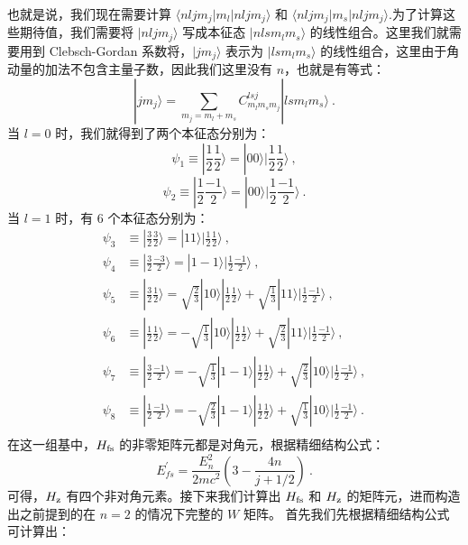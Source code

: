 也就是说，我们现在需要计算 $\langle nljm_j|m_l|nljm_j\rangle$ 和 $\langle nljm_j|m_s|nljm_j\rangle$.为了计算这些期待值，我们需要将 $|nljm_j\rangle$ 写成本征态 $|nlsm_lm_s\rangle$ 的线性组合。这里我们就需要用到 Clebsch-Gordan 系数将，$|jm_j\rangle$ 表示为 $|lsm_lm_s\rangle$ 的线性组合，这里由于角动量的加法不包含主量子数，因此我们这里没有 $n$，也就是有等式：
\begin{equation}
|jm_j\rangle = \sum_{m_j=m_l+m_s}C^{lsj}_{m_lm_sm_j}|lsm_lm_s\rangle~.
\end{equation}
当 $l=0$ 时，我们就得到了两个本征态分别为：
\begin{equation}
\psi_1\equiv|\frac{1}{2}\frac{1}{2}\rangle=|00\rangle|\frac{1}{2}\frac{1}{2}\rangle~,
\end{equation}
\begin{equation}
\psi_2\equiv|\frac{1}{2}\frac{-1}{2}\rangle=|00\rangle|\frac{1}{2}\frac{-1}{2}\rangle~.
\end{equation}
当 $l=1$ 时，有 $6$ 个本征态分别为：
\begin{align}
\psi_3&\equiv|\frac{3}{2}\frac{3}{2}\rangle=|11\rangle|\frac{1}{2}\frac{1}{2}\rangle~,\\
\psi_4&\equiv|\frac{3}{2}\frac{-3}{2}\rangle=|1-1\rangle|\frac{1}{2}\frac{-1}{2}\rangle~,\\
\psi_5&\equiv|\frac{3}{2}\frac{1}{2}\rangle=\sqrt{\frac{2}{3}}|10\rangle|\frac{1}{2}\frac{1}{2}\rangle+\sqrt{\frac{1}{3}}|11\rangle|\frac{1}{2}\frac{-1}{2}\rangle~,\\
\psi_6&\equiv|\frac{1}{2}\frac{1}{2}\rangle=-\sqrt{\frac{1}{3}}|10\rangle|\frac{1}{2}\frac{1}{2}\rangle+\sqrt{\frac{2}{3}}|11\rangle|\frac{1}{2}\frac{-1}{2}\rangle~,\\
\psi_7&\equiv|\frac{3}{2}\frac{-1}{2}\rangle=-\sqrt{\frac{1}{3}}|1-1\rangle|\frac{1}{2}\frac{1}{2}\rangle+\sqrt{\frac{2}{3}}|10\rangle|\frac{1}{2}\frac{-1}{2}\rangle~,\\
\psi_8&\equiv|\frac{1}{2}\frac{-1}{2}\rangle=-\sqrt{\frac{2}{3}}|1-1\rangle|\frac{1}{2}\frac{1}{2}\rangle+\sqrt{\frac{1}{3}}|10\rangle|\frac{1}{2}\frac{-1}{2}\rangle~.\\
\end{align}
在这一组基中，$H_{\rm{fs}}$ 的非零矩阵元都是对角元，根据精细结构公式：
\begin{equation}
E_{fs}^{'}=\frac{E_n^2}{2mc^2}\left(3-\frac{4n}{j+1/2}\right)~.
\end{equation}
可得，$H_{\rm{z}}$ 有四个非对角元素。接下来我们计算出 $H_{\rm{fs}}$ 和 $H_{\rm{z}}$ 的矩阵元，进而构造出之前提到的在 $n=2$ 的情况下完整的 $W$ 矩阵。 首先我们先根据精细结构公式可计算出：

